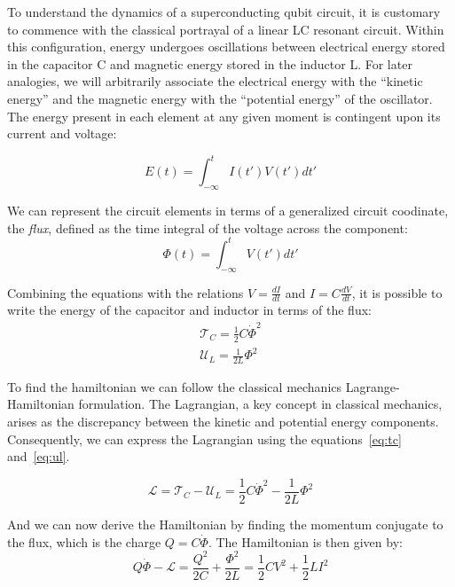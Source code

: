 \documentclass[
  journal=largetwo,
  year=2023,
]{cup-journal}
\begin{document}
To understand the dynamics of a superconducting qubit circuit, it is customary to commence with the classical portrayal of a linear LC resonant circuit. Within this configuration, energy undergoes oscillations between electrical energy stored in the capacitor C and magnetic energy stored in the inductor L. For later analogies, we will arbitrarily associate the electrical energy with the ``kinetic energy'' and the magnetic energy with the ``potential energy'' of the oscillator. The energy present in each element at any given moment is contingent upon its current and voltage:

\begin{equation}
  E(t) = \int_{-\infty}^{t} I(t')V(t')dt'
\end{equation}

We can represent the circuit elements in terms of a generalized circuit coodinate, the {\it flux}, defined as the time integral of the voltage across the component:
\begin{equation}
  \Phi(t) = \int_{-\infty}^{t} V(t')dt'
\end{equation}

Combining the equations with the relations \( V = \frac{dI}{dt} \) and \( I = C \frac{dV}{dt}\), it is possible to write the energy of the capacitor and inductor in terms of the flux:
\begin{eqnarray}
  \mathcal{T}_C = \frac{1}{2}C\dot\Phi^2\label{eq:tc} \\
  \mathcal{U}_L = \frac{1}{2L}\Phi^2\label{eq:ul}
\end{eqnarray}

\noindent To find the hamiltonian we can follow the classical mechanics Lagrange-Hamiltonian formulation. The Lagrangian, a key concept in classical mechanics, arises as the discrepancy between the kinetic and potential energy components. Consequently, we can express the Lagrangian using the equations~\ref{eq:tc} and~\ref{eq:ul}.


\begin{equation}
  \mathcal{L} = \mathcal{T}_C - \mathcal{U}_L = \frac{1}{2}C\dot\Phi^2 - \frac{1}{2L}\Phi^2
\end{equation}

\noindent And we can now derive the Hamiltonian by finding the momentum conjugate to the flux, which is the charge \( Q = C\dot\Phi \). The Hamiltonian is then given by:
\begin{equation}
  Q\dot\Phi-\mathcal{L} = \frac{Q^2}{2C} + \frac{\Phi^2}{2L} = \frac{1}{2}CV^2 + \frac{1}{2}LI^2
\end{equation}
\end{document}
